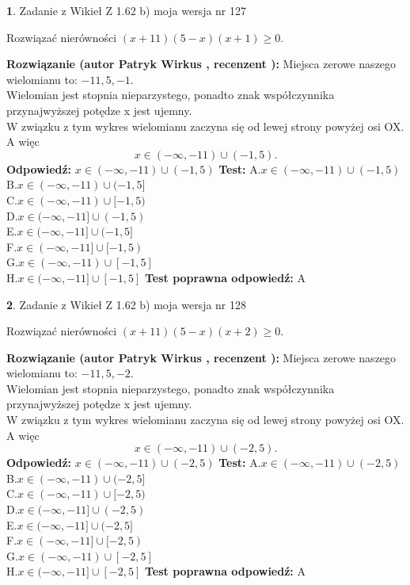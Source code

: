 \documentclass[12pt, a4paper]{article}
\theoremstyle{definition} %
\newtheorem{zad}{}
\newcommand{\zadStart}[1]{\begin{zad}#1\newline}
\newcommand{\zadStop}{\end{zad}}
\newcommand{\rozwStart}[2]{\noindent \textbf{Rozwiązanie (autor #1 , recenzent #2): }\newline}
\newcommand{\rozwStop}{\newline}
\newcommand{\odpStart}{\noindent \textbf{Odpowiedź:}\newline}
\newcommand{\odpStop}{\newline}
\newcommand{\testStart}{\noindent \textbf{Test:}\newline}
\newcommand{\testStop}{\newline}
\newcommand{\kluczStart}{\noindent \textbf{Test poprawna odpowiedź:}\newline}
\newcommand{\kluczStop}{\newline}
\begin{document}
\zadStart{Zadanie z Wikieł Z 1.62 b) moja wersja nr 127}

Rozwiązać nierówności $(x+11)(5-x)(x+1)\ge0$.
\zadStop
\rozwStart{Patryk Wirkus}{}
Miejsca zerowe naszego wielomianu to: $-11, 5, -1$.\\
Wielomian jest stopnia nieparzystego, ponadto znak współczynnika przy\linebreak najwyższej potędze x jest ujemny.\\ W związku z tym wykres wielomianu zaczyna się od lewej strony powyżej osi OX. A więc $$x \in (-\infty,-11) \cup (-1,5).$$
\rozwStop
\odpStart
$x \in (-\infty,-11) \cup (-1,5)$
\odpStop
\testStart
A.$x \in (-\infty,-11) \cup (-1,5)$\\
B.$x \in (-\infty,-11) \cup (-1,5]$\\
C.$x \in (-\infty,-11) \cup [-1,5)$\\
D.$x \in (-\infty,-11] \cup (-1,5)$\\
E.$x \in (-\infty,-11] \cup (-1,5]$\\
F.$x \in (-\infty,-11] \cup [-1,5)$\\
G.$x \in (-\infty,-11) \cup [-1,5]$\\
H.$x \in (-\infty,-11] \cup [-1,5]$
\testStop
\kluczStart
A
\kluczStop



\zadStart{Zadanie z Wikieł Z 1.62 b) moja wersja nr 128}

Rozwiązać nierówności $(x+11)(5-x)(x+2)\ge0$.
\zadStop
\rozwStart{Patryk Wirkus}{}
Miejsca zerowe naszego wielomianu to: $-11, 5, -2$.\\
Wielomian jest stopnia nieparzystego, ponadto znak współczynnika przy\linebreak najwyższej potędze x jest ujemny.\\ W związku z tym wykres wielomianu zaczyna się od lewej strony powyżej osi OX. A więc $$x \in (-\infty,-11) \cup (-2,5).$$
\rozwStop
\odpStart
$x \in (-\infty,-11) \cup (-2,5)$
\odpStop
\testStart
A.$x \in (-\infty,-11) \cup (-2,5)$\\
B.$x \in (-\infty,-11) \cup (-2,5]$\\
C.$x \in (-\infty,-11) \cup [-2,5)$\\
D.$x \in (-\infty,-11] \cup (-2,5)$\\
E.$x \in (-\infty,-11] \cup (-2,5]$\\
F.$x \in (-\infty,-11] \cup [-2,5)$\\
G.$x \in (-\infty,-11) \cup [-2,5]$\\
H.$x \in (-\infty,-11] \cup [-2,5]$
\testStop
\kluczStart
A
\kluczStop
\end{document}
